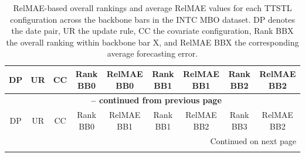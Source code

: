 \documentclass[10pt,a4paper,oneside]{article}
\begin{document}
\begin{longtable}{@{}ccccccccc@{}}

\caption{RelMAE-based overall rankings and average RelMAE values for each TTSTL configuration across the backbone bars in the INTC MBO dataset. DP denotes the date pair, UR the update rule, CC the covariate configuration, Rank BBX the overall ranking within backbone bar X, and RelMAE BBX the corresponding average forecasting error.} 
\label{tab:intc_data_results} \\

\toprule
DP & UR & CC & Rank BB0 & RelMAE BB0 & Rank BB1 & RelMAE BB1 & Rank BB2 & RelMAE BB2 \\
\midrule
\endfirsthead

\multicolumn{9}{c}{{\bfseries \tablename\ \thetable{} -- continued from previous page}} \\
\toprule
DP & UR & CC & Rank BB0 & RelMAE BB1 & Rank BB1 & RelMAE BB2 & Rank BB3 & RelMAE BB2 \\
\midrule
\endhead

\midrule
\multicolumn{9}{r}{{Continued on next page}} \\
\bottomrule
\endfoot

\bottomrule
\endlastfoot


\end{longtable}
\end{document}
